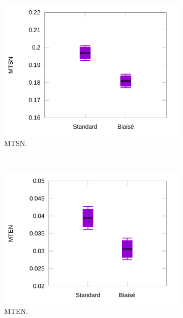 	\begin{figure}[htbp]
		\begin{subfigure}[t]{0.49\textwidth}
			\centering
			\includegraphics[width=\textwidth]{figures/ch5/hookNormTimes}
			\caption{MTSN.}
			\label{fig:hookNormTimes}
		\end{subfigure}
		~
		\begin{subfigure}[t]{0.49\textwidth}
			\centering
			\includegraphics[width=\textwidth]{figures/ch5/hookNormErrors}
			\caption{MTEN.}
			\label{fig:hookNormErrors}
		\end{subfigure}
		~
		\begin{subfigure}[t]{0.49\textwidth}
			\centering

\end{subfigure}
\end{figure}
